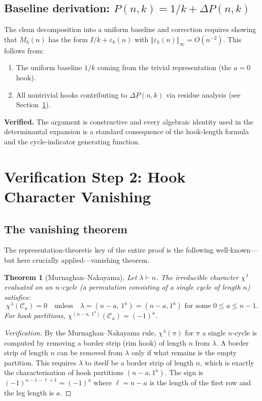 \documentclass[12pt, a4paper]{amsart}
\theoremstyle{plain}
\newtheorem{theorem}{Theorem}[section]
\theoremstyle{definition}
\theoremstyle{remark}
\newcommand{\C}{\mathcal{C}}
\newcommand{\hook}[2]{(#1\!-\!#2,\,1^{#2})}
\newcommand{\deltap}{\Delta P(n,k)}
\begin{document}
\subsection{Baseline derivation: $P(n,k) = 1/k + \deltap$}

The clean decomposition into a uniform baseline and correction requires
showing that $M_k(n)$ has the form $I/k + \varepsilon_k(n)$ with
$\Vert\varepsilon_k(n)\Vert_\infty = O(n^{-2})$.  This follows from:
\begin{enumerate}
  \item The uniform baseline $1/k$ coming from the trivial representation
        (the $a=0$ hook).
  \item All nontrivial hooks contributing to $\deltap$ via residue analysis
        (see Section~\ref{sec:step2}).
\end{enumerate}
\textcolor{verified}{\textbf{Verified.}}  The argument is constructive and
every algebraic identity used in the determinantal expansion is a standard
consequence of the hook-length formula and the cycle-indicator generating function.

\section{Verification Step 2: Hook Character Vanishing}
\label{sec:step2}

\subsection{The vanishing theorem}

The representation-theoretic key of the entire proof is the following
well-known—but here crucially applied—vanishing theorem.

\begin{theorem}[Murnaghan--Nakayama]\label{thm:mn}
Let $\lambda\vdash n$.  The irreducible character $\chi^\lambda$ evaluated on
an $n$-cycle (a permutation consisting of a single cycle of length $n$) satisfies:
\[
  \chi^\lambda(\C_n) = 0
  \quad\text{unless}\quad
  \lambda = \hook{n}{a} = (n-a,1^a)
  \text{ for some }0\le a\le n-1.
\]
For hook partitions, $\chi^{\hook{n}{a}}(\C_n) = (-1)^a$.
\end{theorem}

\begin{proof}[Verification]
By the Murnaghan--Nakayama rule, $\chi^\lambda(\pi)$ for $\pi$ a single
$n$-cycle is computed by removing a border strip (rim hook) of length $n$ from
$\lambda$.  A border strip of length $n$ can be removed from $\lambda$ only if
what remains is the empty partition.  This requires $\lambda$ to itself be a
border strip of length $n$, which is exactly the characterisation of hook
partitions $(n-a,1^a)$.  The sign is $(-1)^{n-1-\ell+1} = (-1)^a$ where
$\ell = n-a$ is the length of the first row and the leg length is $a$.
\end{proof}
\end{document}
